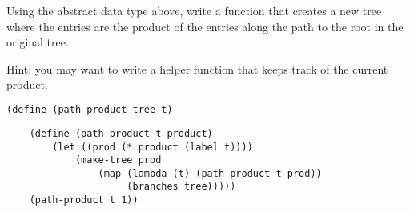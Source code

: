 \question Using the abstract data type above, write a function that
creates a new tree where the entries are the product of the entries along
the path to the root in the original tree.

Hint: you may want to write a helper function that keeps track of the
current product.
\begin{center}
\end{center}

\begin{lstlisting}[language=Scheme]
(define (path-product-tree t)
\end{lstlisting}
\begin{solution}[2in]
\begin{lstlisting}
    (define (path-product t product)
        (let ((prod (* product (label t))))
            (make-tree prod
                (map (lambda (t) (path-product t prod))
                     (branches tree)))))
    (path-product t 1))
\end{lstlisting}
\end{solution}
\begin{lstlisting}
\end{lstlisting}
